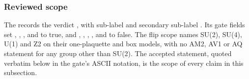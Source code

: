 \subsubsection{Reviewed scope}
\label{sec:bd1-scope}
The  records the
verdict , with sub-label
 and secondary sub-label
. Its gate fields set
, ,
,  and
 to true, and ,
, ,
,  and
 to false. The flip scope names SU(2),
SU(4), U(1) and Z2 on their one-plaquette and box models, with no AM2, AV1 or
AQ statement for any group other than SU(2). The accepted statement, quoted
verbatim below in the gate's ASCII notation, is the scope of every claim in
this subsection.
